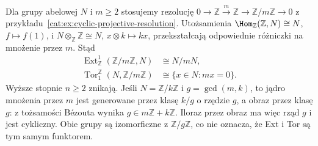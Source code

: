 \begin{przyklad}\label{cat:ex:ext-tor-cyclic}
Dla grupy abelowej $N$ i $m\ge2$ stosujemy rezolucję $0\to\mathbb Z\xrightarrow{m}\mathbb Z\to\mathbb Z/m\mathbb Z\to0$ z przykładu~\ref{cat:ex:cyclic-projective-resolution}. Utożsamienia $\Hom_{\mathbb Z}(\mathbb Z,N)\cong N$, $f\mapsto f(1)$, i $N\otimes_{\mathbb Z}\mathbb Z\cong N$, $x\otimes k\mapsto kx$, przekształcają odpowiednie różniczki na mnożenie przez $m$. Stąd
\[
\begin{aligned}
 \operatorname{Ext}_{\mathbb Z}^1(\mathbb Z/m\mathbb Z,N)&\cong N/mN,\\
 \operatorname{Tor}_1^{\mathbb Z}(N,\mathbb Z/m\mathbb Z)&\cong\{x\in N:mx=0\}.
\end{aligned}
\]
Wyższe stopnie $n\ge2$ znikają. Jeśli $N=\mathbb Z/k\mathbb Z$ i $g=\gcd(m,k)$, to jądro mnożenia przez $m$ jest generowane przez klasę $k/g$ o rzędzie $g$, a obraz przez klasę $g$: z tożsamości Bézouta wynika $g\in m\mathbb Z+k\mathbb Z$. Iloraz przez obraz ma więc rząd $g$ i jest cykliczny. Obie grupy są izomorficzne z $\mathbb Z/g\mathbb Z$, co nie oznacza, że Ext i Tor są tym samym funktorem.
\end{przyklad}

